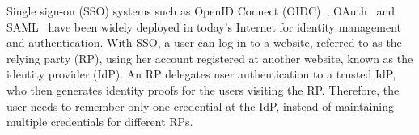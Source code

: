 

Single sign-on (SSO) systems such as OpenID Connect (OIDC)~\cite{OpenIDConnect}, OAuth~\cite{rfc6749} and SAML~\cite{SAML} have been widely deployed in today's Internet for identity management and authentication. With SSO, a user can log in to a website, referred to as the relying party (RP), using her account registered at another website, known as the identity provider (IdP). An RP delegates user authentication to a trusted IdP, who then generates identity proofs for the users visiting the RP. Therefore, the user needs to remember only one credential at the IdP, instead of maintaining multiple credentials for different RPs.


